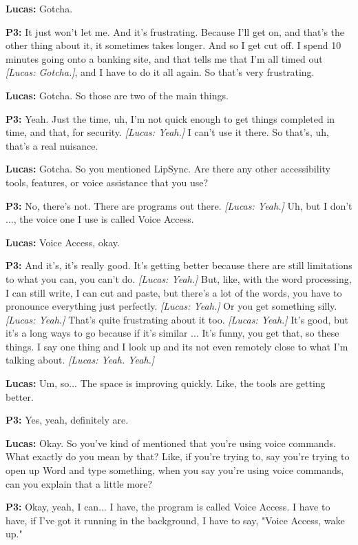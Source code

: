 \textbf{Lucas:} Gotcha. 

\textbf{P3:} It just won't let me. And it's frustrating. Because I'll get on, and that's the other thing about it, it sometimes takes longer. And so I get cut off. I spend 10 minutes going onto a banking site, and that tells me that I'm all timed out \textit{[Lucas: Gotcha.]}, and I have to do it all again. So that's very frustrating. 

\textbf{Lucas:} Gotcha. So those are two of the main things. 

\textbf{P3:} Yeah. Just the time, uh, I'm not quick enough to get things completed in time, and that, for security. \textit{[Lucas: Yeah.]} I can't use it there. So that's, uh, that's a real nuisance. 

\textbf{Lucas:} Gotcha. So you mentioned LipSync. Are there any other accessibility tools, features, or voice assistance that you use? 

\textbf{P3:} No, there's not. There are programs out there. \textit{[Lucas: Yeah.]} Uh, but I don't ..., the voice one I use is called Voice Access. 

\textbf{Lucas:} Voice Access, okay. 

\textbf{P3:} And it's, it's really good. It's getting better because there are still limitations to what you can, you can't do. \textit{[Lucas: Yeah.]} But, like, with the word processing, I can still write, I can cut and paste, but there's a lot of the words, you have to pronounce everything just perfectly. \textit{[Lucas: Yeah.]} Or you get something silly. \textit{[Lucas: Yeah.]} That's quite frustrating about it too. \textit{[Lucas: Yeah.]} It's good, but it's a long ways to go because if it's similar ... It's funny, you get that, so these things. I say one thing and I look up and its not even remotely close to what I'm talking about. \textit{[Lucas: Yeah. Yeah.]} 

\textbf{Lucas:} Um, so... The space is improving quickly. Like, the tools are getting better. 

\textbf{P3:} Yes, yeah, definitely are. 

\textbf{Lucas:} Okay. So you've kind of mentioned that you're using voice commands. What exactly do you mean by that? Like, if you're trying to, say you're trying to open up Word and type something, when you say you're using voice commands, can you explain that a little more? 

\textbf{P3:} Okay, yeah, I can... I have, the program is called Voice Access. I have to have, if I've got it running in the background, I have to say, "Voice Access, wake up." 

